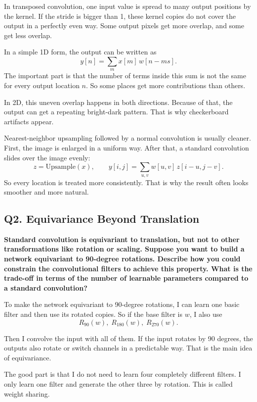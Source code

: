 \documentclass[12pt,a4paper]{article}
\newcommand{\qtext}[1]{\noindent\textbf{#1}\par}
\newcommand{\ansstart}{\begingroup\color{answerblue}}
\newcommand{\ansend}{\endgroup}
\begin{document}
\ansstart
In transposed convolution, one input value is spread to many output positions by the kernel. If the stride is bigger than 1, these kernel copies do not cover the output in a perfectly even way. Some output pixels get more overlap, and some get less overlap.

In a simple 1D form, the output can be written as
\[
y[n] = \sum_m x[m]\,w[n-ms].
\]
The important part is that the number of terms inside this sum is not the same for every output location \(n\). So some places get more contributions than others.

In 2D, this uneven overlap happens in both directions. Because of that, the output can get a repeating bright-dark pattern. That is why checkerboard artifacts appear.

Nearest-neighbor upsampling followed by a normal convolution is usually cleaner. First, the image is enlarged in a uniform way. After that, a standard convolution slides over the image evenly:
\[
z = \text{Upsample}(x), \qquad
y[i,j] = \sum_{u,v} w[u,v]\,z[i-u,j-v].
\]
So every location is treated more consistently. That is why the result often looks smoother and more natural.
\ansend

\clearpage

\subsection{Q2. Equivariance Beyond Translation}

\qtext{Standard convolution is equivariant to translation, but not to other transformations like rotation or scaling. Suppose you want to build a network equivariant to 90-degree rotations. Describe how you could constrain the convolutional filters to achieve this property. What is the trade-off in terms of the number of learnable parameters compared to a standard convolution?}

\ansstart
To make the network equivariant to 90-degree rotations, I can learn one basic filter and then use its rotated copies. So if the base filter is \(w\), I also use
\[
R_{90}(w),\; R_{180}(w),\; R_{270}(w).
\]

Then I convolve the input with all of them. If the input rotates by 90 degrees, the outputs also rotate or switch channels in a predictable way. That is the main idea of equivariance.

The good part is that I do not need to learn four completely different filters. I only learn one filter and generate the other three by rotation. This is called weight sharing.
\end{document}
